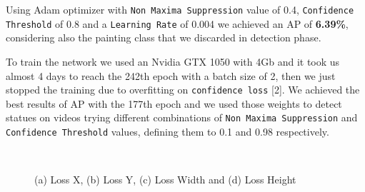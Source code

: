 \documentclass[10pt,twocolumn,letterpaper]{article}
\begin{document}
Using Adam optimizer with {\tt Non Maxima Suppression} value of 0.4, {\tt Confidence Threshold} of 0.8 
and a {\tt Learning Rate} of 0.004 we achieved an AP of {\bf 6.39\%}, considering also the painting class that we 
discarded in detection phase. 

To train the network we used an Nvidia GTX 1050 with 4Gb and it took us almost 4 days to
reach the 242th epoch with a batch size of 2, then we just stopped the training due to overfitting on 
{\tt confidence loss} [2]. 
We achieved the best results of AP with the 177th epoch and we used those weights to detect
statues on videos trying different combinations of {\tt Non Maxima Suppression} and {\tt Confidence Threshold} values,
defining them to 0.1 and 0.98 respectively.

\begin{figure}
    \centering
    \\
    \caption{(a) Loss X, (b) Loss Y, (c) Loss Width and (d) Loss Height}
    \label{fig:foobar}
\end{figure}
\end{document}
